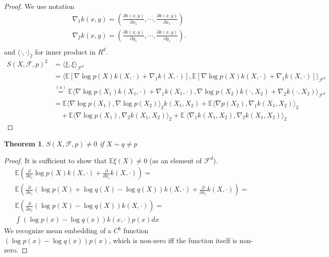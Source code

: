 \documentclass{article}
\newtheorem{Theorem}{Theorem}
\newcommand{\ev}{\mathbb{E}}
\begin{document}
\begin{proof}
We use notation 
\begin{align*}
 \nabla_1 k(x,y) = \left( \frac{\partial k(x,y) }{\partial x_1}, \cdots, \frac{\partial k(x,y) }{\partial x_1} \right) \\
 \nabla_2 k(x,y) = \left( \frac{\partial k(x,y) }{\partial y_1}, \cdots, \frac{\partial k(x,y) }{\partial y_1} \right). \\ 
\end{align*}
and $\langle \cdot, \cdot\rangle_2 $ for inner product in $R^d$.
\begin{align*}
S(X,\mathcal{F},p)^2 & = \langle \xi, \xi \rangle_{\mathcal{F}^d } \\
& = \langle \ev \left[\nabla \log p(X) k(X,\cdot)+\nabla_1 k(X,\cdot)\right] ,\ev \left[\nabla \log p(X) k(X,\cdot)+\nabla_1 k(X,\cdot)\right] \rangle_{\mathcal{F}^d } \\
& \overset{(a)}{=} \ev \langle   \nabla \log p(X_1) k(X_1,\cdot) + \nabla_1 k(X_1,\cdot) , \nabla \log p(X_2) k(\cdot,X_2) + \nabla_2 k(\cdot,X_2) \rangle_{\mathcal{F}^d } \\
& = \ev\langle \nabla \log p(X_1) , \nabla\log p(X_2) \rangle_{2} k(X_1,X_2) + \ev \langle \nabla p(X_2),  \nabla_1 k(X_1,X_2) \rangle_{2} \\
  & \quad +  \ev \langle \nabla  \log p(X_1), \nabla_{2}  k(X_1,X_2) \rangle_{2} +  \ev\ \langle  \nabla_1 k(X_1,X_2), \nabla_2 k(X_1,X_2) \rangle_{2}
\end{align*}



\end{proof}

\begin{Theorem}
\label{th2}
$S(X,\mathcal{F},p) \neq  0$ if $X \sim q \neq p$
\end{Theorem}

\begin{proof}
 It is sufficient to show that $\ev \xi(X) \neq 0$ (as an element of $\mathcal{F}^d$).
\begin{align*}
 &\ev \left( \frac{\partial } {\partial x_i} \log p(X) k(X,\cdot) + \frac{\partial } {\partial x_i} k(X,\cdot)  \right) =\\
 &\ev \left( \frac{\partial } {\partial x_i} ( \log  p(X) + \log  q(X)- \log  q(X)  )  k(X,\cdot)   + \frac{\partial } {\partial x_i} k(X,\cdot) \right) = \\
 &\ev \left(  \frac{\partial } {\partial x_i} (\log p(X) - \log q(X))k(X,\cdot) \right)  = \\
 & \int  (\log p(x) - \log q(x) ) k(x,\cdot) p(x) dx
\end{align*}
We recognize mean embedding of a $C^b$ function $(\log p(x) - \log q(x) ) p(x)$, which is non-zero iff the function itself is non-zero. 
\end{proof}
\end{document}
